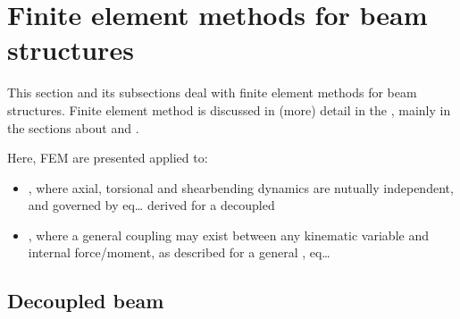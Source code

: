 \documentclass[letterpaper,10pt,english]{jupyterBook}
\begin{document}
\chapter{Finite element methods for beam structures}
\label{\detokenize{ch/solids/small-displacements-fem-beams:finite-element-methods-for-beam-structures}}\label{\detokenize{ch/solids/small-displacements-fem-beams:solid-mechanics-intro-small-displacements-beam-fem}}\label{\detokenize{ch/solids/small-displacements-fem-beams::doc}}
\sphinxAtStartPar
This section and its sub\sphinxhyphen{}sections deal with finite element methods for beam structures. Finite element method is discussed in (more) detail in the
, mainly in the sections about  and .

\sphinxAtStartPar
Here, FEM are presented applied to:
\begin{itemize}
\item {} 
\sphinxAtStartPar
{}, where axial, torsional and shear\sphinxhyphen{}bending dynamics are nutually independent, and governed by eq… derived for a decoupled {\hyperref[\detokenize{ch/solids/beams/timoshenko:solid-mechanics-small-displacements-beams-timoshenko}]{}}

\item {} 
\sphinxAtStartPar
{\hyperref[\detokenize{ch/solids/small-displacements-fem-beams-general:solid-mechanics-intro-small-displacements-beam-fem-general}]{}}, where a general coupling may exist between any kinematic variable and internal force/moment, as described for a general {\hyperref[\detokenize{ch/solids/beams/timoshenko:solid-mechanics-small-displacements-beams-timoshenko}]{}}, eq…

\end{itemize}

\sphinxstepscope


\section{Decoupled beam}
\label{\detokenize{ch/solids/small-displacements-fem-beams-decoupled:decoupled-beam}}\label{\detokenize{ch/solids/small-displacements-fem-beams-decoupled:solid-mechanics-intro-small-displacements-beam-fem-decoupled}}\label{\detokenize{ch/solids/small-displacements-fem-beams-decoupled::doc}}
\end{document}
